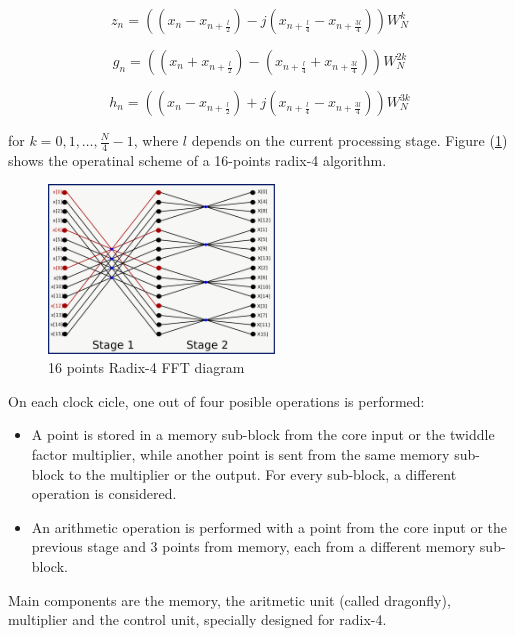 \documentclass[conference]{IEEEtran}
\begin{document}
\begin{equation}
z_n = ((x_n - x_{n+\frac{l}{2}}) -j (x_{n+\frac{l}{4}}
-x_{n+\frac{3l}{4}})) W_N^{k}
\label{eq:radix4_subz}
\end{equation}

\begin{equation}
g_n = ((x_n + x_{n+\frac{l}{2}}) - (x_{n+\frac{l}{4}}
+ x_{n+\frac{3l}{4}})) W_N^{2k}
\label{eq:radix4_subg}
\end{equation}

\begin{equation}
h_n = ((x_n - x_{n+\frac{l}{2}}) +j (x_{n+\frac{l}{4}} - x_{n+\frac{3l}{4}})) W_N^{3k}
\label{eq:radix4_subh}
\end{equation}

for $k = 0,1,\ldots,\frac{N}{4}-1$, where $l$ depends on the current processing stage.
Figure (\ref{fig:r4_diag}) shows the operatinal scheme of a 16-points radix-4 algorithm.

\begin{figure}[htb!]
        \centering
        \includegraphics[width=6cm]{./figures/r4_16.png}
        \caption{16 points Radix-4 FFT diagram}
        \label{fig:r4_diag}
\end{figure}

On each clock cicle, one out of four posible operations is performed:

\begin{itemize}
  \item A point is stored in a memory sub-block from the core input or the twiddle factor multiplier, while another point is sent 
  from the same memory sub-block to the multiplier or the output. For every sub-block, a different operation is considered.
  \item An arithmetic operation is performed with a point from the core input or the previous stage and 3 points from memory, each
  from a different memory sub-block. 
\end{itemize}

Main components are the memory, the aritmetic unit (called dragonfly), multiplier and the control unit, specially designed
for radix-4.
\end{document}
